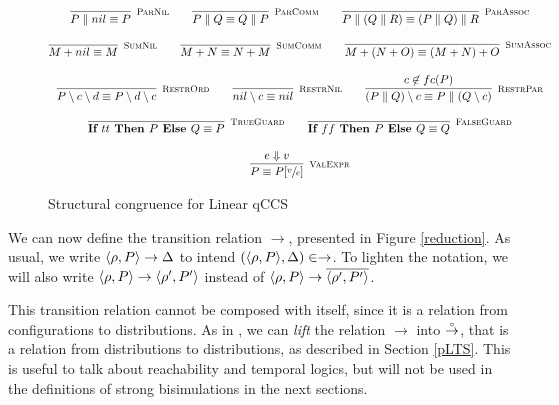 \begin{figure}[h!]
\begin{gather*}
    \infer[\mbox{\footnotesize\scshape ParNil}]{P \parallel nil \equiv P}{} \qquad
    \infer[\mbox{\footnotesize\scshape ParComm}]{P \parallel Q \equiv Q \parallel P}{} \qquad
    \infer[\mbox{\footnotesize\scshape ParAssoc}]{P \parallel (Q \parallel R) \equiv (P \parallel Q) \parallel R}{} 
    \\[0.3cm]
    \infer[\mbox{\footnotesize\scshape SumNil}]{M + nil \equiv M}{} \qquad
    \infer[\mbox{\footnotesize\scshape SumComm}]{M + N \equiv N + M}{} \qquad
    \infer[\mbox{\footnotesize\scshape SumAssoc}]{M + (N + O) \equiv (M + N) + O}{} 
    \\[0.3cm]
    \infer[\mbox{\footnotesize\scshape RestrOrd}]{P \setminus c \setminus d \equiv P \setminus d \setminus c}{} \qquad 
    \infer[\mbox{\footnotesize\scshape RestrNil}]{nil \setminus c \equiv nil}{} \qquad 
    \infer[\mbox{\footnotesize\scshape RestrPar}]{(P \parallel Q) \setminus c \equiv P \parallel (Q \setminus c)}{c \not\in fc(P)} \\[0.3cm]
    \infer[\mbox{\footnotesize\scshape TrueGuard}]{\ITE{tt}{P}{Q} \equiv P}{} \qquad
    \infer[\mbox{\footnotesize\scshape FalseGuard}]{\ITE{ff}{P}{Q} \equiv Q}{} \\[0.3cm]
    \infer[\mbox{\footnotesize\scshape ValExpr}]{ P \equiv P[\sfrac{v}{e}] }{e \Downarrow v} 
	\end{gather*}	
\caption{Structural congruence for Linear qCCS}
\label{str_cong}
\end{figure}

We can now define the transition relation $\rightarrow$, presented in Figure \ref{reduction}. As usual, we write $\langle\rho, P\rangle \rightarrow \Delta$ to intend $(\langle\rho, P\rangle, \Delta) \in \rightarrow$. To lighten the notation, we will also write $\langle\rho, P\rangle \rightarrow \langle\rho', P'\rangle$ instead of $\langle\rho, P\rangle \rightarrow \overline{\langle\rho', P'\rangle}$.

This transition relation cannot be composed with itself, since it is a relation from configurations to distributions. As in \cite{fengBisimulationQuantumProcesses2012}, we can \textit{lift} the relation $\rightarrow$ into $\stackrel{\scriptscriptstyle \circ}{\rightarrow}$, that is a relation from distributions to distributions, as described in Section \ref{pLTS}. This is useful to talk about reachability and temporal logics, but will not be used in the definitions of strong bisimulations in the next sections.

